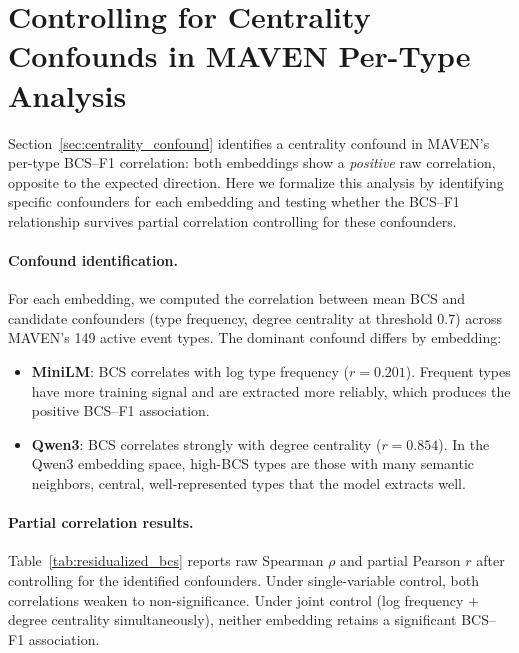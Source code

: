 \documentclass[11pt]{article}
\begin{document}
\section{Controlling for Centrality Confounds in MAVEN Per-Type Analysis}
\label{sec:appendix_residualized_bcs}

Section~\ref{sec:centrality_confound} identifies a centrality confound in MAVEN's per-type BCS--F1 correlation: both embeddings show a \emph{positive} raw correlation, opposite to the expected direction. Here we formalize this analysis by identifying specific confounders for each embedding and testing whether the BCS--F1 relationship survives partial correlation controlling for these confounders.

\paragraph{Confound identification.}
For each embedding, we computed the correlation between mean BCS and candidate confounders (type frequency, degree centrality at threshold 0.7) across MAVEN's 149 active event types. The dominant confound differs by embedding:
\begin{itemize}[itemsep=2pt,leftmargin=*]
\item \textbf{MiniLM}: BCS correlates with log type frequency ($r = 0.201$). Frequent types have more training signal and are extracted more reliably, which produces the positive BCS--F1 association.
\item \textbf{Qwen3}: BCS correlates strongly with degree centrality ($r = 0.854$). In the Qwen3 embedding space, high-BCS types are those with many semantic neighbors, central, well-represented types that the model extracts well.
\end{itemize}

\paragraph{Partial correlation results.}
Table~\ref{tab:residualized_bcs} reports raw Spearman $\rho$ and partial Pearson $r$ after controlling for the identified confounders. Under single-variable control, both correlations weaken to non-significance. Under joint control (log frequency $+$ degree centrality simultaneously), neither embedding retains a significant BCS--F1 association.
\end{document}
